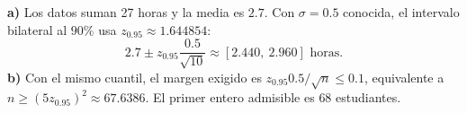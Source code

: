 \textbf{a)} Los datos suman 27 horas y la media es $2.7$.
Con $\sigma=0.5$ conocida, el intervalo bilateral al $90\%$
usa $z_{0.95}\approx1.644854$:
\[
2.7\pm z_{0.95}\frac{0.5}{\sqrt{10}}
\approx\boxed{[2.440,\ 2.960]\text{ horas}}.
\]
\textbf{b)} Con el mismo cuantil, el margen exigido es
$z_{0.95}0.5/\sqrt n\le0.1$, equivalente a
$n\ge(5z_{0.95})^2\approx67.6386$.
El primer entero admisible es $\boxed{68}$ estudiantes.
